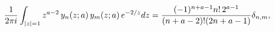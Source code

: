 \[\frac{1}{2\pi i}\int_{|z|=1}z^{a-2}\mathop{y_{n}\/}\nolimits\!\left(z;a\right)%
\mathop{y_{m}\/}\nolimits\!\left(z;a\right)e^{-2/z}dz=\frac{(-1)^{n+a-1}n!\,2^%
{a-1}}{(n+a-2)!(2n+a-1)}\delta_{n,m},\]